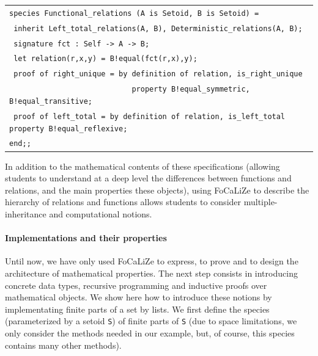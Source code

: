 \documentclass[submission,copyright,creativecommons]{eptcs}
\def\focalize{FoCaLiZe \mbox{}}
\begin{document}
\begin{center}
\begin{scriptsize}
\begin{tabular}{|l|}
\hline
\verb+species Functional_relations (A is Setoid, B is Setoid) =+\\
\verb+ inherit Left_total_relations(A, B), Deterministic_relations(A, B);+\\
\verb+ signature fct : Self -> A -> B;+\\
\verb+ let relation(r,x,y) = B!equal(fct(r,x),y);+\\
\verb+ proof of right_unique = by definition of relation, is_right_unique+\\
\verb+                            property B!equal_symmetric, B!equal_transitive;+\\
\verb+ proof of left_total = by definition of relation, is_left_total property B!equal_reflexive;+\\
\verb+end;;+\\
\hline
\end{tabular}
\end{scriptsize}
\end{center}

\noindent
In addition to the mathematical contents of these specifications
(allowing students to understand at a deep
level the differences between functions and relations, and the
main properties these objects),
using
\focalize to describe the hierarchy of relations and functions allows
students to consider multiple-inheritance and computational notions.

\paragraph{Implementations and their properties}
Until now, we have only used \focalize to express, to prove and to
design the architecture of mathematical properties. The next step
consists in introducing
concrete data types,
recursive programming and inductive proofs over mathematical objects.
We show here how  to introduce
these notions by implementating finite parts of a set by lists. We
first define the species 
(parameterized by a setoid {\footnotesize \tt S})
of finite parts of 
{\footnotesize \tt S} (due to space limitations, we only consider the methods needed
in our example, but, of course, this species contains many other methods).
\end{document}

